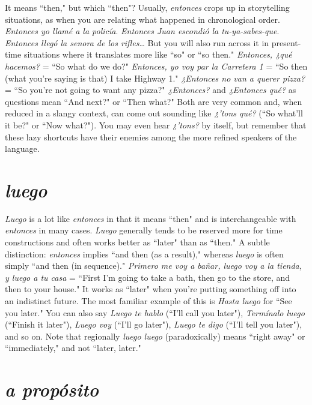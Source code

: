 It means ``then," but which ``then"? Usually, \emph{entonces} crops
up in storytelling situations, as when you are relating what happened
in chronological order. \emph{Entonces yo llamé a la policía}. \emph{Entonces Juan
	escondió la tu-ya-sabes-que}. \emph{Entonces llegó la senora de los rifles}\ldots{}
But you will also run across it in present-time situations where it
translates more like ``so" or ``so then." \emph{Entonces, ¿qué hacemos?} = ``So
what do we do?" \emph{Entonces, yo voy par la Carretera 1} = ``So then (what
you're saying is that) I take Highway 1." \emph{¿Entonces no van a querer
	pizza?} = ``So you're not going to want any pizza?" \emph{¿Entonces?} and \emph{¿Entonces qué?} as questions mean ``And next?" or ``Then what?" Both are
very common and, when reduced in a slangy context, can come out
sounding like \emph{¿'tons qué?} (``So what'll it be?" or ``Now what?").
You
may even hear \emph{¿'tons?} by itself, but remember that these lazy shortcuts
have their enemies among the more refined speakers of the language.

\section{\emph{luego}}

\emph{Luego} is a lot like \emph{entonces} in that it means ``then" and is interchangeable with \emph{entonces} in many cases. \emph{Luego} generally tends
to be reserved more for time constructions and often works better as
``later" than as ``then." A subtle distinction: \emph{entonces} implies ``and
then (as a result)," whereas \emph{luego} is often simply ``and then (in sequence)." \emph{Primero me voy a bañar, luego voy a la tienda, y luego a tu
	casa} = ``First I'm going to take a bath, then go to the store, and then
to your house." It works as ``later" when you're putting something off
into an indistinct future. The most familiar example of this is \emph{Hasta
	luego} for ``See you later." You can also say \emph{Luego te hablo} (``I'll call
you later"), \emph{Termínalo luego} (``Finish it later"), \emph{Luego voy} (``I'll go
later"), \emph{Luego te digo} (``I'll tell you later"), and so on. Note that regionally \emph{luego luego} (paradoxically) means ``right away" or ``immediately,"
and not ``later, later."

\section{\emph{a propósito}}

